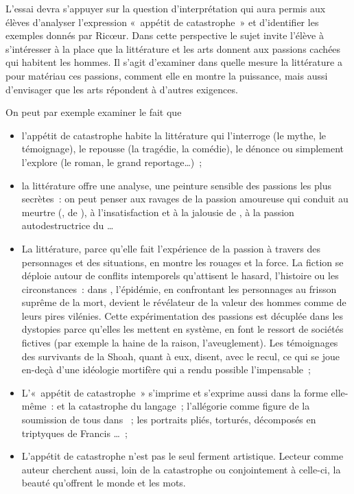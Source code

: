 {L'essai devra s'appuyer sur la question d'interprétation qui aura permis aux élèves
d'analyser l'expression «~appétit de catastrophe~» et d'identifier les exemples donnés
par Ricœur. Dans cette perspective le sujet invite l'élève à s'intéresser à la place que
la littérature et les arts donnent aux passions cachées qui habitent les hommes. Il s'agit
d'examiner dans quelle mesure la littérature a pour matériau ces passions, comment
elle en montre la puissance, mais aussi d'envisager que les arts répondent à d'autres
exigences.

On peut par exemple examiner le fait que

\begin{itemize}
\item l'appétit de catastrophe habite la littérature qui l'interroge (le mythe, le témoignage),
le repousse (la tragédie, la comédie), le dénonce ou simplement l'explore (le roman,
le grand reportage…)~;
\item la littérature offre une analyse, une peinture sensible des passions les plus secrètes~:
on peut penser aux ravages de la passion amoureuse qui conduit au meurtre (,  de ), à l'insatisfaction et à la jalousie de ,
à la passion autodestructrice du …
\item La littérature, parce qu'elle fait l'expérience de la passion à travers des personnages
et des situations, en montre les rouages et la force. La fiction se déploie autour de
conflits intemporels qu'attisent le hasard, l'histoire ou les circonstances~: dans , l'épidémie, en confrontant les personnages au frisson suprême de
la mort, devient le révélateur de la valeur des hommes comme de leurs pires vilénies.
Cette expérimentation des passions est décuplée dans les dystopies parce qu'elles
les mettent en système, en font le ressort de sociétés fictives (par exemple la haine de
la raison, l'aveuglement). Les témoignages des survivants de la Shoah, quant à eux,
disent, avec le recul, ce qui se joue en-deçà d'une idéologie mortifère qui a rendu
possible l'impensable~;
\item L'«~appétit de catastrophe~» s'imprime et s'exprime aussi dans la forme elle-même~:
 et la catastrophe du langage~; l'allégorie comme figure de la soumission de
tous dans ~; les portraits pliés, torturés, décomposés en triptyques de
Francis …~;
\item L'appétit de catastrophe n'est pas le seul ferment artistique. Lecteur comme auteur
cherchent aussi, loin de la catastrophe ou conjointement à celle-ci, la beauté qu'offrent
le monde et les mots.
\end{itemize}

}
